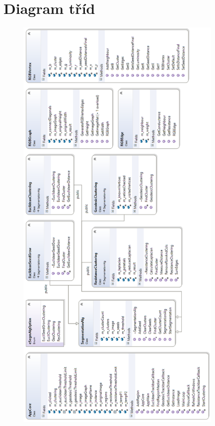 \documentclass[czech, master, public, dept460, male, cpdeclaration, oneside]{diploma}
\begin{document}
\appendix

\section{Diagram tříd}

\begin{figure}[H]
	\centering
	\includegraphics[width=10cm]{Figures/explanatory/appClassDiagram.png}
\end{figure}
\end{document}
